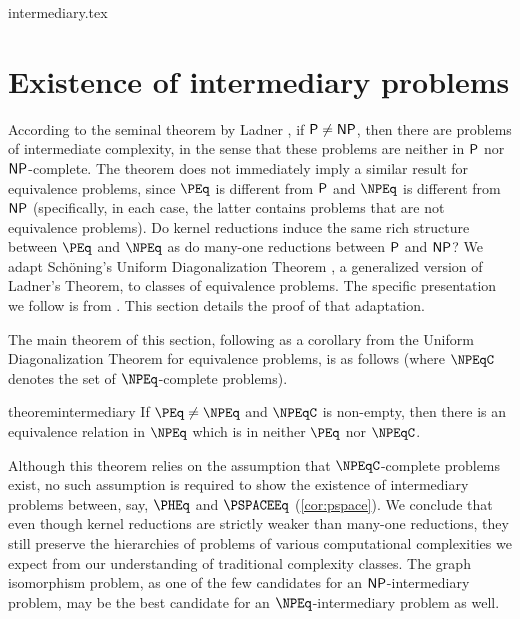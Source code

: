\begin{filecontents}{intermediary.tex}
\section{Existence of intermediary problems}
\label{sec:intermediary}
%
According to the seminal theorem by Ladner \cite{ladner}, if $\P \neq \NP$, then there are problems of intermediate complexity, in the sense that these problems are neither in $\P$ nor $\NP$-complete.
The theorem does not immediately imply a similar result for equivalence problems, since $\PEq$ is different from $\P$ and $\NPEq$ is different from $\NP$ (specifically, in each case, the latter contains problems that are not equivalence problems).
Do kernel reductions induce the same rich structure between $\PEq$ and $\NPEq$ as do many-one reductions between $\P$ and $\NP$?
We adapt Schöning's Uniform Diagonalization Theorem \cite{schoning}, a generalized version of Ladner's Theorem, to classes of equivalence problems.
The specific presentation we follow is from \cite{bdg95}.
This section details the proof of that adaptation.

%
The main theorem of this section, following as a corollary from the Uniform Diagonalization Theorem for equivalence problems, is as follows (where $\NPEqC$ denotes the set of $\NPEq$-complete problems).
\begin{restatable*}{theorem}{intermediary}\label{thm:intermediary}
  If $\PEq \neq \NPEq$ and $\NPEqC$ is non-empty, then there is an equivalence relation in $\NPEq$ which is in neither $\PEq$ nor $\NPEqC$.
\end{restatable*}
Although this theorem relies on the assumption that $\NPEqC$-complete problems exist, no such assumption is required to show the existence of intermediary problems between, say, $\PHEq$ and $\PSPACEEq$ (\ref{cor:pspace}).
We conclude that even though kernel reductions are strictly weaker than many-one reductions, they still preserve the hierarchies of problems of various computational complexities we expect from our understanding of traditional complexity classes.
The graph isomorphism problem, as one of the few candidates for an $\NP$-intermediary problem, may be the best candidate for an $\NPEq$-intermediary problem as well.


\end{filecontents}
